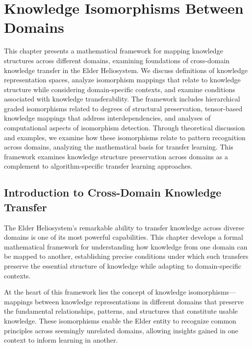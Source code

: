 \chapter{Knowledge Isomorphisms Between Domains}

\begin{tcolorbox}[colback=blue!5!white,colframe=blue!75!black,title=Chapter Summary]
This chapter presents a mathematical framework for mapping knowledge structures across different domains, examining foundations of cross-domain knowledge transfer in the Elder Heliosystem. We discuss definitions of knowledge representation spaces, analyze isomorphism mappings that relate to knowledge structure while considering domain-specific contexts, and examine conditions associated with knowledge transferability. The framework includes hierarchical graded isomorphisms related to degrees of structural preservation, tensor-based knowledge mappings that address interdependencies, and analyses of computational aspects of isomorphism detection. Through theoretical discussion and examples, we examine how these isomorphisms relate to pattern recognition across domains, analyzing the mathematical basis for transfer learning. This framework examines knowledge structure preservation across domains as a complement to algorithm-specific transfer learning approaches.
\end{tcolorbox}

\section{Introduction to Cross-Domain Knowledge Transfer}

The Elder Heliosystem's remarkable ability to transfer knowledge across diverse domains is one of its most powerful capabilities. This chapter develops a formal mathematical framework for understanding how knowledge from one domain can be mapped to another, establishing precise conditions under which such transfers preserve the essential structure of knowledge while adapting to domain-specific contexts.

At the heart of this framework lies the concept of knowledge isomorphisms—mappings between knowledge representations in different domains that preserve the fundamental relationships, patterns, and structures that constitute usable knowledge. These isomorphisms enable the Elder entity to recognize common principles across seemingly unrelated domains, allowing insights gained in one context to inform learning in another.

